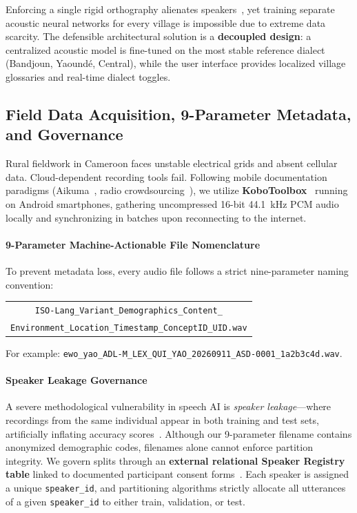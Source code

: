 \documentclass[conference]{IEEEtran}
\begin{document}
Enforcing a single rigid orthography alienates speakers~\cite{tadadjeu1979alphabet}, yet training separate acoustic neural networks for every village is impossible due to extreme data scarcity. The defensible architectural solution is a \textbf{decoupled design}: a centralized acoustic model is fine-tuned on the most stable reference dialect (Bandjoun, Yaound\'e, Central), while the user interface provides localized village glossaries and real-time dialect toggles.

\subsection{Field Data Acquisition, 9-Parameter Metadata, and Governance}
\label{sec:sota:fieldwork}

Rural fieldwork in Cameroon faces unstable electrical grids and absent cellular data. Cloud-dependent recording tools fail. Following mobile documentation paradigms (Aikuma~\cite{kobotoolbox2024}, radio crowdsourcing~\cite{conneau2023fleurs}), we utilize \textbf{KoboToolbox}~\cite{kobotoolbox2024} running on Android smartphones, gathering uncompressed 16-bit 44.1~kHz PCM audio locally and synchronizing in batches upon reconnecting to the internet.

\paragraph{9-Parameter Machine-Actionable File Nomenclature}
To prevent metadata loss, every audio file follows a strict nine-parameter naming convention:
\begin{center}
\begin{tabular}{@{}c@{}}
\footnotesize\texttt{ISO-Lang\_Variant\_Demographics\_Content\_}\\
\footnotesize\texttt{Environment\_Location\_Timestamp\_ConceptID\_UID.wav}
\end{tabular}
\end{center}
For example: \texttt{ewo\_yao\_ADL-M\_}\allowbreak\texttt{LEX\_QUI\_YAO\_}\allowbreak\texttt{20260911\_ASD-0001\_}\allowbreak\texttt{1a2b3c4d.wav}.

\paragraph{Speaker Leakage Governance}
A severe methodological vulnerability in speech AI is \textit{speaker leakage}---where recordings from the same individual appear in both training and test sets, artificially inflating accuracy scores~\cite{kobotoolbox2024}. Although our 9-parameter filename contains anonymized demographic codes, filenames alone cannot enforce partition integrity. We govern splits through an \textbf{external relational Speaker Registry table} linked to documented participant consent forms~\cite{carroll2020care}. Each speaker is assigned a unique \texttt{speaker\_id}, and partitioning algorithms strictly allocate all utterances of a given \texttt{speaker\_id} to either train, validation, or test.
\end{document}
